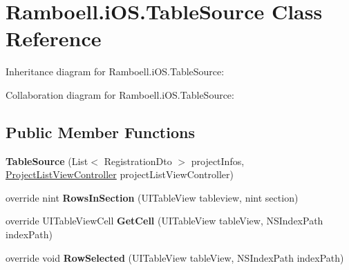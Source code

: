 \hypertarget{class_ramboell_1_1i_o_s_1_1_table_source}{}\section{Ramboell.\+i\+O\+S.\+Table\+Source Class Reference}
\label{class_ramboell_1_1i_o_s_1_1_table_source}


Inheritance diagram for Ramboell.\+i\+O\+S.\+Table\+Source\+:


Collaboration diagram for Ramboell.\+i\+O\+S.\+Table\+Source\+:
\subsection*{Public Member Functions}
\begin{DoxyCompactItemize}
\item 
\mbox{\label{class_ramboell_1_1i_o_s_1_1_table_source_a5fb8505918e88892eabd85c6dec8b497}} 
{\bfseries Table\+Source} (List$<$ Registration\+Dto $>$ project\+Infos, \hyperlink{class_ramboell_1_1i_o_s_1_1_project_list_view_controller}{Project\+List\+View\+Controller} project\+List\+View\+Controller)
\item 
\mbox{\label{class_ramboell_1_1i_o_s_1_1_table_source_a1a8e92696ee9117753ece243e4cddfe0}} 
override nint {\bfseries Rows\+In\+Section} (U\+I\+Table\+View tableview, nint section)
\item 
\mbox{\label{class_ramboell_1_1i_o_s_1_1_table_source_a7bd63e83a5b5a86d5143bf4645ad70c6}} 
override U\+I\+Table\+View\+Cell {\bfseries Get\+Cell} (U\+I\+Table\+View table\+View, N\+S\+Index\+Path index\+Path)
\item 
\mbox{\label{class_ramboell_1_1i_o_s_1_1_table_source_aeb3dbc467781e4e4fed884e82e6719b1}} 
override void {\bfseries Row\+Selected} (U\+I\+Table\+View table\+View, N\+S\+Index\+Path index\+Path)
\end{DoxyCompactItemize}
